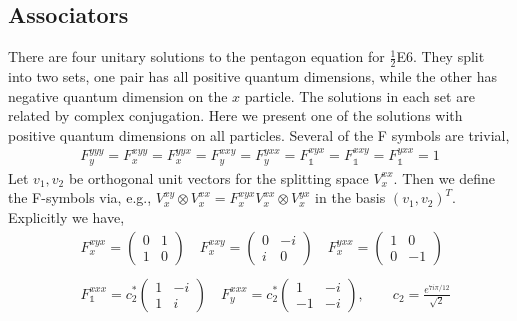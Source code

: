 \documentclass[12pt,a4paper]{article}
\newcommand{\tp}{\otimes}
\begin{document}
\subsection{Associators}
\label{E6Fsymbols}
There are four unitary solutions to the pentagon equation for $\frac{1}{2}$E6. They split into two sets, one pair has all positive quantum dimensions, while the other has negative quantum dimension on the $x$ particle. 
The solutions in each set are related by complex conjugation. 
Here we present one of the solutions with positive quantum dimensions on all particles. 
Several of the F symbols are trivial,
\begin{align}
F^{yyy}_y = F^{xyy}_x = F^{yyx}_x = F^{xxy}_y  = F^{yxx}_y = F^{xyx}_{\mathds{1}} = F^{xxy}_{\mathds{1}} = F^{yxx}_{\mathds{1}}= 1
\end{align}
Let $v_1, v_2$ be orthogonal unit vectors for the splitting space $V^{xx}_x$. 
Then we define the F-symbols via, e.g., $V^{xy}_x \tp V^{xx}_x  = F^{xyx}_x V^{xx}_x \tp V^{yx}_x$ in the basis $(v_1, v_2)^{T}$.
Explicitly we have,
\begin{align}
&F^{xyx}_x = \left(\begin{matrix}
0&1\\
1&0
\end{matrix} \right) \quad
F^{xxy}_x = \left(\begin{matrix}
0&-i\\
i&0
\end{matrix} \right) \quad
F^{yxx}_x = \left(\begin{matrix}
1&0\\
0&-1
\end{matrix} \right) 
\\
\\
&F^{xxx}_{\mathds{1}} = c_2^* \left(\begin{matrix}
1&-i\\
1&i
\end{matrix} \right) \quad
F^{xxx}_y = c_2^*\left(\begin{matrix}
1&-i\\
-1&-i
\end{matrix} \right), \quad \quad c_2  = \frac{e^{7 i \pi/12}}{\sqrt{2}}
\end{align}
\end{document}
